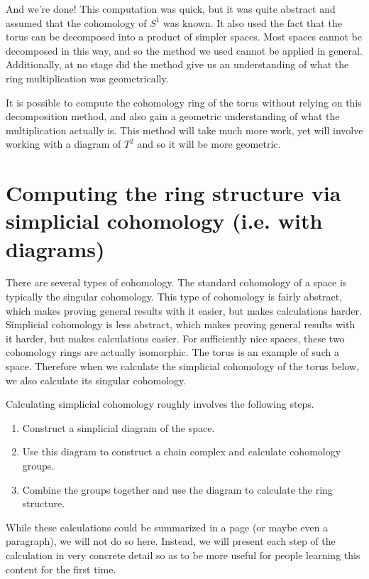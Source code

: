 \documentclass[12pt,a4paper]{article}
\begin{document}
And we're done! This computation was quick, but it was quite abstract and assumed that the cohomology of $S^1$ was known. It also used the fact that the torus can be decomposed into a product of simpler spaces. Most spaces cannot be decomposed in this way, and so the method we used cannot be applied in general. Additionally, at no stage did the method give us an understanding of what the ring multiplication was geometrically.

It is possible to compute the cohomology ring of the torus without relying on this decomposition method, and also gain a geometric understanding of what the multiplication actually is. This method will take much more work, yet will involve working with a diagram of $T^2$ and so it will be more geometric.

\section*{Computing the ring structure via simplicial cohomology (i.e. with diagrams)}

There are several types of cohomology. The standard cohomology of a space is typically the singular cohomology. This type of cohomology is fairly abstract, which makes proving general results with it easier, but makes calculations harder. Simplicial cohomology is less abstract, which makes proving general results with it harder, but makes calculations easier. For sufficiently nice spaces, these two cohomology rings are actually isomorphic. The torus is an example of such a space. Therefore when we calculate the simplicial cohomology of the torus below, we also calculate its singular cohomology.

Calculating simplicial cohomology roughly involves the following steps.
\begin{enumerate}
\item Construct a simplicial diagram of the space.
\item Use this diagram to construct a chain complex and calculate cohomology groups.
\item Combine the groups together and use the diagram to calculate the ring structure.
\end{enumerate}

While these calculations could be summarized in a page (or maybe even a paragraph), we will not do so here. Instead, we will present each step of the calculation in very concrete detail so as to be more useful for people learning this content for the first time.
\end{document}
